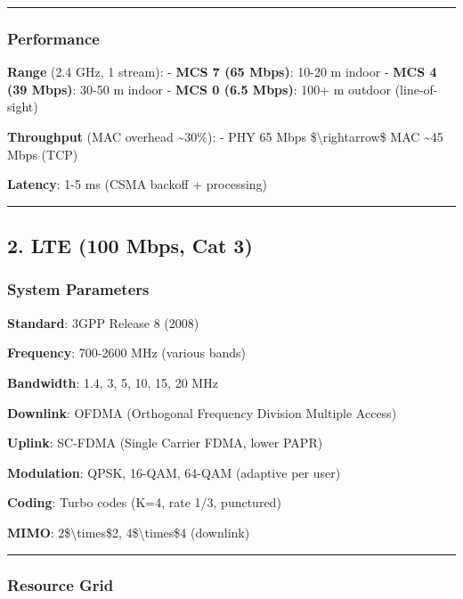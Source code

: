 \begin{center}\rule{0.5\linewidth}{0.5pt}\end{center}

\subsubsection{Performance}\label{performance}

\textbf{Range} (2.4 GHz, 1 stream): - \textbf{MCS 7 (65 Mbps)}: 10-20 m
indoor - \textbf{MCS 4 (39 Mbps)}: 30-50 m indoor - \textbf{MCS 0 (6.5
Mbps)}: 100+ m outdoor (line-of-sight)

\textbf{Throughput} (MAC overhead \textasciitilde30\%): - PHY 65 Mbps
\$\textbackslash rightarrow\$ MAC \textasciitilde45 Mbps (TCP)

\textbf{Latency}: 1-5 ms (CSMA backoff + processing)

\begin{center}\rule{0.5\linewidth}{0.5pt}\end{center}

\subsection{2. LTE (100 Mbps, Cat 3)}\label{lte-100-mbps-cat-3}

\subsubsection{System Parameters}\label{system-parameters-1}

\textbf{Standard}: 3GPP Release 8 (2008)

\textbf{Frequency}: 700-2600 MHz (various bands)

\textbf{Bandwidth}: 1.4, 3, 5, 10, 15, 20 MHz

\textbf{Downlink}: OFDMA (Orthogonal Frequency Division Multiple Access)

\textbf{Uplink}: SC-FDMA (Single Carrier FDMA, lower PAPR)

\textbf{Modulation}: QPSK, 16-QAM, 64-QAM (adaptive per user)

\textbf{Coding}: Turbo codes (K=4, rate 1/3, punctured)

\textbf{MIMO}: 2\$\textbackslash times\$2, 4\$\textbackslash times\$4
(downlink)

\begin{center}\rule{0.5\linewidth}{0.5pt}\end{center}

\subsubsection{Resource Grid}\label{resource-grid}

